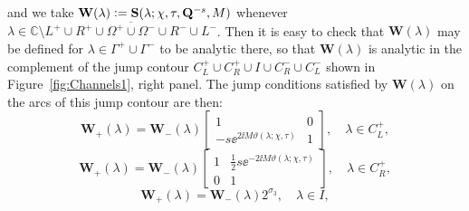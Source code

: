 and we take $\mathbf{W}(\lambda)\vcentcolon=\mathbf{S}(\lambda;\chi,\tau,\mathbf{Q}^{-s},M)$ whenever $\lambda\in \mathbb{C}\setminus\overline{L^+\cup R^+\cup\Omega^+\cup\Omega^-\cup R^-\cup L^-}$.  Then it is easy to check that $\mathbf{W}(\lambda)$ may be defined for $\lambda\in\Gamma^+\cup\Gamma^-$ to be analytic there, so that $\mathbf{W}(\lambda)$ is analytic in the complement of the jump contour $C_L^+\cup C_R^+\cup I\cup C_R^-\cup C_L^-$ shown in Figure~\ref{fig:Channels1}, right panel.  The jump conditions satisfied by $\mathbf{W}(\lambda)$ on the arcs of this jump contour are then:
\begin{equation}
\mathbf{W}_+(\lambda)=\mathbf{W}_-(\lambda)\begin{bmatrix}1 & 0\\
-s\ee^{2\ii M\vartheta(\lambda;\chi,\tau)} & 1\end{bmatrix},\quad\lambda\in C_L^+,
\label{eq:Tjump-channels-CLplus-ALT}
\end{equation}
\begin{equation}
\mathbf{W}_+(\lambda)=\mathbf{W}_-(\lambda)\begin{bmatrix}1 & \tfrac{1}{2}s\ee^{-2\ii M\vartheta(\lambda;\chi,\tau)} \\ 0 & 1\end{bmatrix},\quad\lambda\in C_R^+,
\label{eq:Tjump-channels-CRplus-ALT}
\end{equation}
\begin{equation}
\mathbf{W}_+(\lambda)=\mathbf{W}_-(\lambda)2^{\sigma_3},\quad\lambda\in I,
\label{eq:Channels-T-I-jump}
\end{equation}

